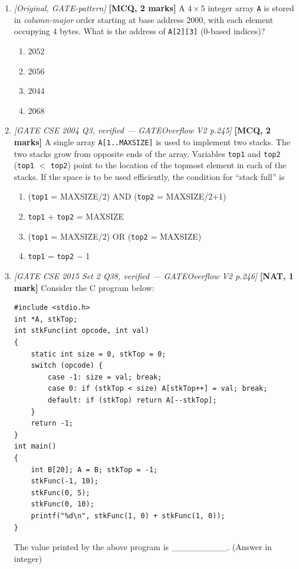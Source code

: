 \documentclass[11pt]{article}
\begin{document}
\begin{enumerate}
\item[\textbf{Q4}] \textit{[Original, GATE-pattern]} \textbf{[MCQ, 2 marks]} A $4 \times 5$ integer array \texttt{A} is stored in \emph{column-major} order starting at base address $2000$, with each element occupying $4$ bytes. What is the address of \texttt{A[2][3]} (0-based indices)?
\begin{enumerate}
  \item[(A)] $2052$
  \item[(B)] $2056$
  \item[(C)] $2044$
  \item[(D)] $2068$
\end{enumerate}

\item[\textbf{Q5}] \textit{[GATE CSE 2004 Q3, verified --- GATEOverflow V2 p.245]} \textbf{[MCQ, 2 marks]} A single array \texttt{A[1..MAXSIZE]} is used to implement two stacks. The two stacks grow from opposite ends of the array. Variables \texttt{top1} and \texttt{top2} (\texttt{top1} $<$ \texttt{top2}) point to the location of the topmost element in each of the stacks. If the space is to be used efficiently, the condition for ``stack full'' is
\begin{enumerate}
  \item[(A)] (\texttt{top1} = MAXSIZE/2) AND (\texttt{top2} = MAXSIZE/2+1)
  \item[(B)] \texttt{top1} + \texttt{top2} = MAXSIZE
  \item[(C)] (\texttt{top1} = MAXSIZE/2) OR (\texttt{top2} = MAXSIZE)
  \item[(D)] \texttt{top1} = \texttt{top2} $-$ 1
\end{enumerate}

\item[\textbf{Q6}] \textit{[GATE CSE 2015 Set 2 Q38, verified --- GATEOverflow V2 p.246]} \textbf{[NAT, 1 mark]} Consider the C program below:
\begin{verbatim}
#include <stdio.h>
int *A, stkTop;
int stkFunc(int opcode, int val)
{
    static int size = 0, stkTop = 0;
    switch (opcode) {
        case -1: size = val; break;
        case 0: if (stkTop < size) A[stkTop++] = val; break;
        default: if (stkTop) return A[--stkTop];
    }
    return -1;
}
int main()
{
    int B[20]; A = B; stkTop = -1;
    stkFunc(-1, 10);
    stkFunc(0, 5);
    stkFunc(0, 10);
    printf("%d\n", stkFunc(1, 0) + stkFunc(1, 0));
}
\end{verbatim}
The value printed by the above program is \_\_\_\_\_\_\_\_\_. (Answer in integer)


\end{enumerate}
\end{document}
